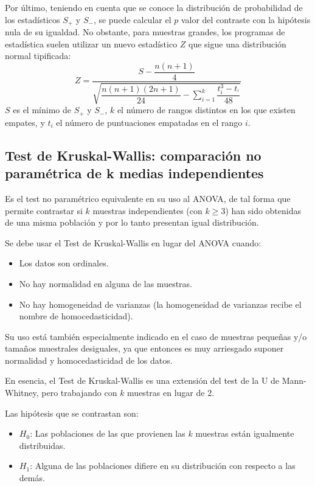 Por último, teniendo en cuenta que se conoce la distribución de probabilidad de los estadísticos $S_+$ y $S_-$, se puede calcular el $p$
valor del contraste con la hipótesis nula de su igualdad. No obstante, para muestras grandes, los programas de estadística suelen utilizar
un nuevo estadístico $Z$ que sigue una distribución normal tipificada:
\[
Z = \dfrac{{S - \dfrac{{n\left( {n + 1} \right)}}{4}}}{{\sqrt {\dfrac{{n\left( {n + 1} \right)\left( {2n + 1} \right)}}{{24}} -
\sum\limits_{i = 1}^k {\dfrac{{t_i ^3  - t_{^i } }}{{48}}} } }} 
\]
$S$ es el mínimo de $S_+$ y $S_-$, $k$ el número de rangos distintos en los que existen empates, y $t_i$ el número de puntuaciones empatadas
en el rango $i$.


\subsection{Test de Kruskal-Wallis: comparación no paramétrica de k medias independientes}
Es el test no paramétrico equivalente en su uso al ANOVA, de tal forma que permite contrastar si $k$ muestras independientes (con $k\geq3$)
han sido obtenidas de una misma población y por lo tanto presentan igual distribución.

Se debe usar el Test de Kruskal-Wallis en lugar del ANOVA cuando:
\begin{itemize}
\item Los datos son ordinales.
\item No hay normalidad en alguna de las muestras.
\item No hay homogeneidad de varianzas (la homogeneidad de varianzas recibe el nombre de homocedasticidad).
\end{itemize}

Su uso está también especialmente indicado en el caso de muestras pequeñas y/o tamaños muestrales desiguales, ya que entonces es muy
arriesgado suponer normalidad y homocedasticidad de los datos.

En esencia, el Test de Kruskal-Wallis es una extensión del test de la U de Mann-Whitney, pero trabajando con $k$ muestras en lugar de 2.

Las hipótesis que se contrastan son:
\begin{itemize}
\item $H_0$: Las poblaciones de las que provienen las $k$ muestras están igualmente distribuidas.
\item $H_1$: Alguna de las poblaciones difiere en su distribución con respecto a las demás.
\end{itemize}

